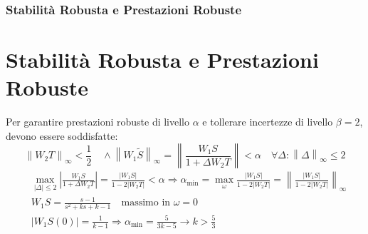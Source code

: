 \documentclass{beamer}
\begin{document}
\begin{frame}
	\frametitle{Stabilità Robusta e Prestazioni Robuste}
	\section{Stabilità Robusta e Prestazioni Robuste}
	Per garantire prestazioni robuste di livello \(\alpha \) e tollerare incertezze di livello \(\beta =2 \), devono essere soddisfatte:
	\begin{equation*}
		\left\lVert W_{2}T\right\rVert_{\infty}<\frac{1}{2}\quad \land  \left\lVert W_{1}\tilde{S}\right\rVert_{\infty}=\left\lVert \frac{W_{1}S}{1+\Delta W_{2}T}\right\rVert<\alpha\quad \forall\Delta:\left\lVert \Delta\right\rVert_{\infty}\leq 2
	\end{equation*}
	\begin{align*}
		 & \max_{\left\lvert \Delta\right\rvert\leq 2}\left\lvert \frac{W_{1}S}{1+\Delta W_{2}T}\right\rvert=\frac{\left\lvert W_{1}S \right\rvert}{1-2 \left\lvert W_{2}T\right\rvert}<\alpha \Rightarrow \alpha_{\min}=\max_{\omega}{\frac{\left\lvert W_{1}S \right\rvert}{1-2 \left\lvert W_{2}T\right\rvert}}=\left\lVert \frac{\left\lvert W_{1}S \right\rvert}{1-2 \left\lvert W_{2}T\right\rvert}\right\rVert_{\infty} \\
		 & W_{1}S=\frac{s-1}{s^{2}+ks+k-1}\quad \text{massimo in }\omega=0                                                                                                                                                                                                                                                                                                                                                     \\
		 & \left\lvert W_{1}S(0)\right\rvert =\frac{1}{k-1}\Rightarrow \alpha_{\min}=\frac{5}{3k-5}\rightarrow k>\frac{5}{3}
	\end{align*}
\end{frame}
\end{document}
